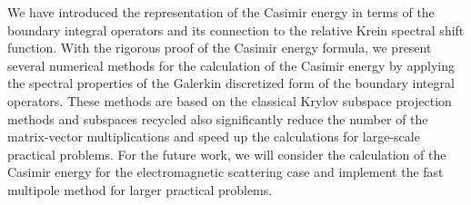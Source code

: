 We have introduced the representation of the Casimir energy in terms of the boundary integral operators and its connection to the relative Krein spectral shift 
function. With the rigorous proof of the Casimir energy formula, we present several numerical methods for 
the calculation of the Casimir energy by applying the spectral properties of the Galerkin discretized form of the boundary 
integral operators. These methods are based on the classical Krylov subspace projection methods and subspaces recycled also significantly reduce the number of the matrix-vector 
multiplications and speed up the calculations for large-scale practical problems.  For the future work, we will consider the calculation of the Casimir energy 
for the electromagnetic scattering case and implement the fast multipole method for larger practical problems.
